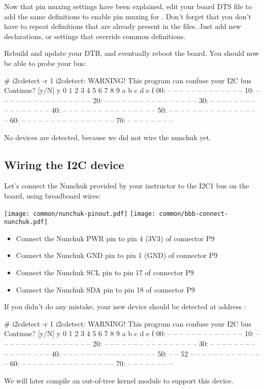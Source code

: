 Now that pin muxing settings have been explained, edit your board
DTS file to add the same definitions to enable pin muxing for .
Don't forget that you don't have to repeat definitions that are
already present in the  files. Just add new declarations, or
settings that override common definitions.

Rebuild and update your DTB, and eventually reboot the board. You should
now be able to probe your bus:

\begin{bashinput}
# i2cdetect -r 1
i2cdetect: WARNING! This program can confuse your I2C bus
Continue? [y/N] y
     0  1  2  3  4  5  6  7  8  9  a  b  c  d  e  f
00:          -- -- -- -- -- -- -- -- -- -- -- -- --
10: -- -- -- -- -- -- -- -- -- -- -- -- -- -- -- --
20: -- -- -- -- -- -- -- -- -- -- -- -- -- -- -- --
30: -- -- -- -- -- -- -- -- -- -- -- -- -- -- -- --
40: -- -- -- -- -- -- -- -- -- -- -- -- -- -- -- --
50: -- -- -- -- -- -- -- -- -- -- -- -- -- -- -- --
60: -- -- -- -- -- -- -- -- -- -- -- -- -- -- -- --
70: -- -- -- -- -- -- -- --
\end{bashinput}

No devices are detected, because we did not wire the nunchuk yet.

\subsection{Wiring the I2C device}

Let's connect the Nunchuk provided by your instructor
to the I2C1 bus on the board, using breadboard wires:

\texttt{[image: common/nunchuk-pinout.pdf]}
\texttt{[image: common/bbb-connect-nunchuk.pdf]}

\begin{itemize}
\item Connect the Nunchuk PWR pin to pin 4 (3V3) of connector P9
\item Connect the Nunchuk GND pin to pin 1 (GND) of connector P9
\item Connect the Nunchuk SCL pin to pin 17 of connector P9
\item Connect the Nunchuk SDA pin to pin 18 of connector P9
\end{itemize}

If you didn't do any mistake, your new device should be detected at
address :

\begin{bashinput}
# i2cdetect -r 1
i2cdetect: WARNING! This program can confuse your I2C bus
Continue? [y/N] y
     0  1  2  3  4  5  6  7  8  9  a  b  c  d  e  f
00:          -- -- -- -- -- -- -- -- -- -- -- -- --
10: -- -- -- -- -- -- -- -- -- -- -- -- -- -- -- --
20: -- -- -- -- -- -- -- -- -- -- -- -- -- -- -- --
30: -- -- -- -- -- -- -- -- -- -- -- -- -- -- -- --
40: -- -- -- -- -- -- -- -- -- -- -- -- -- -- -- --
50: -- -- 52 -- -- -- -- -- -- -- -- -- -- -- -- --
60: -- -- -- -- -- -- -- -- -- -- -- -- -- -- -- --
70: -- -- -- -- -- -- -- --
\end{bashinput}

We will later compile an out-of-tree kernel module to support this device.
